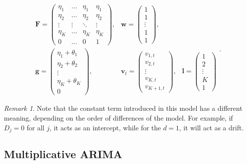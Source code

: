 \documentclass[]{book}
\theoremstyle{definition}
\theoremstyle{definition}
\theoremstyle{definition}
\theoremstyle{definition}
\theoremstyle{remark}
\newtheorem*{remark}{Remark}
\begin{document}
\begin{equation}
  \begin{aligned}
    \mathbf{F} = \begin{pmatrix} \eta_1 & \dots & \eta_1 & \eta_1 \\ \eta_2 & \dots & \eta_2 & \eta_2 \\ \vdots & \vdots & \ddots & \vdots \\ \eta_K & \dots & \eta_K & \eta_K \\ 0 & \dots & 0 & 1 \end{pmatrix}, & \mathbf{w} = \begin{pmatrix} 1 \\ 1 \\ \vdots \\ 1 \\ 1 \end{pmatrix}, \\
    \mathbf{g} = \begin{pmatrix} \eta_1 + \theta_1 \\ \eta_2 + \theta_2 \\ \vdots \\ \eta_K + \theta_K \\ 0 \end{pmatrix}, & \mathbf{v}_{t} = \begin{pmatrix} v_{1,t} \\ v_{2,t} \\ \vdots \\ v_{K,t} \\ v_{K+1,t} \end{pmatrix}, & \mathbf{l} = \begin{pmatrix} 1 \\ 2 \\ \vdots \\ K \\ 1 \end{pmatrix}
  \end{aligned}.
  \label{eq:ADAMARIMAMatricesConstant}
\end{equation}

\begin{remark}
Note that the constant term introduced in this model has a different meaning, depending on the order of differences of the model. For example, if \(D_j=0\) for all \(j\), it acts as an intercept, while for the \(d=1\), it will act as a drift.
\end{remark}

\hypertarget{ADAMARIMAPureMultiplicative}{%
\subsection{Multiplicative ARIMA}\label{ADAMARIMAPureMultiplicative}}
\end{document}
